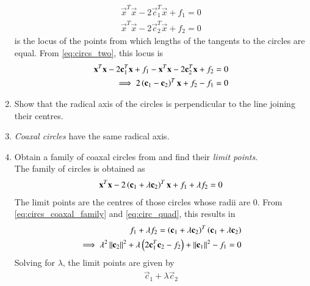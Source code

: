 \begin{enumerate}[label=\arabic*.,ref=\thesubsection.\theenumi]
\begin{align}
\vec{x}^T\vec{x}-2\vec{c}_1^T\vec{x} + f_1 = 0
\\
\vec{x}^T\vec{x}-2\vec{c}_2^T\vec{x} + f_2 = 0
\end{align}
%
is the locus of the points from which lengths of the tangents to the circles are equal.  From \eqref{eq:circs_two}, this locus is
\begin{align}
\mathbf{x}^T\mathbf{x}-2\mathbf{c}_1^T\mathbf{x} + f_1 -
\mathbf{x}^T\mathbf{x}-2\mathbf{c}_2^T\mathbf{x} + f_2 = 0
\\
\implies 2\left(\mathbf{c}_1-\mathbf{c}_2\right)^T\mathbf{x} + f_2 - f_1 = 0
\label{eq:circs_rad_axis}
\end{align}
\item Show that the radical axis of the circles is perpendicular to the line joining their centres.\item {\em Coaxal circles} have the same radical axis.
\item Obtain a family of coaxal circles from \label{eq:circs_two} and find their {\em limit points}.
\\
\solution The family of circles is obtained as
\begin{align}
\label{eq:circs_coaxal_family}
\mathbf{x}^T\mathbf{x}-2\left(\mathbf{c}_1 +\lambda\mathbf{c}_2\right)^T\mathbf{x} + f_1 +\lambda f_2= 0
\end{align}
%
The limit points are the centres of those circles whose radii are 0. From \eqref{eq:circs_coaxal_family} and \eqref{eq:circ_quad},
this results in
\begin{align}
f_1 +\lambda f_2 =  \left(\mathbf{c}_1 +\lambda\mathbf{c}_2\right)^T\left(\mathbf{c}_1 +\lambda\mathbf{c}_2\right) &
\\
\implies \lambda^2 \left\lVert\mathbf{c}_2\right\rVert^2 + \lambda \left(2\mathbf{c}_1^T\mathbf{c}_2-f_2\right) + \left\lVert\mathbf{c}_1\right\rVert^2-f_1 = 0&
\end{align}
Solving for $\lambda$, the limit points are given by  
\begin{align}
\vec{c}_1+\lambda\vec{c}_2
\end{align}
\end{enumerate}



